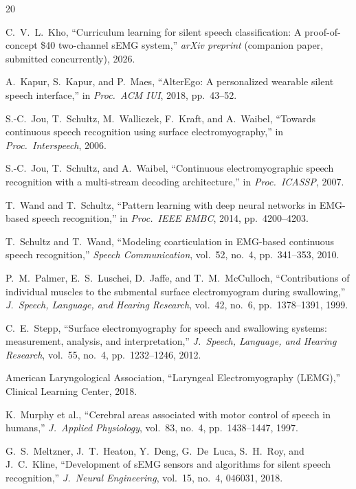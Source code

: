 \documentclass[11pt, a4paper]{article}
\begin{document}
\begin{thebibliography}{20}

C.~V.~L.\ Kho, ``Curriculum learning for silent speech classification: A proof-of-concept \$40 two-channel sEMG system,'' \emph{arXiv preprint} (companion paper, submitted concurrently), 2026.

A.\ Kapur, S.\ Kapur, and P.\ Maes, ``AlterEgo: A personalized wearable silent speech interface,'' in \emph{Proc.\ ACM IUI}, 2018, pp.\ 43--52.

S.-C.\ Jou, T.\ Schultz, M.\ Walliczek, F.\ Kraft, and A.\ Waibel, ``Towards continuous speech recognition using surface electromyography,'' in \emph{Proc.\ Interspeech}, 2006.

S.-C.\ Jou, T.\ Schultz, and A.\ Waibel, ``Continuous electromyographic speech recognition with a multi-stream decoding architecture,'' in \emph{Proc.\ ICASSP}, 2007.

T.\ Wand and T.\ Schultz, ``Pattern learning with deep neural networks in EMG-based speech recognition,'' in \emph{Proc.\ IEEE EMBC}, 2014, pp.\ 4200--4203.

T.\ Schultz and T.\ Wand, ``Modeling coarticulation in EMG-based continuous speech recognition,'' \emph{Speech Communication}, vol.~52, no.~4, pp.\ 341--353, 2010.

P.~M.\ Palmer, E.~S.\ Luschei, D.\ Jaffe, and T.~M.\ McCulloch, ``Contributions of individual muscles to the submental surface electromyogram during swallowing,'' \emph{J.\ Speech, Language, and Hearing Research}, vol.~42, no.~6, pp.\ 1378--1391, 1999.

C.~E.\ Stepp, ``Surface electromyography for speech and swallowing systems: measurement, analysis, and interpretation,'' \emph{J.\ Speech, Language, and Hearing Research}, vol.~55, no.~4, pp.\ 1232--1246, 2012.

American Laryngological Association, ``Laryngeal Electromyography (LEMG),'' Clinical Learning Center, 2018.

K.\ Murphy et al., ``Cerebral areas associated with motor control of speech in humans,'' \emph{J.\ Applied Physiology}, vol.~83, no.~4, pp.\ 1438--1447, 1997.

G.~S.\ Meltzner, J.~T.\ Heaton, Y.\ Deng, G.\ De~Luca, S.~H.\ Roy, and J.~C.\ Kline, ``Development of sEMG sensors and algorithms for silent speech recognition,'' \emph{J.\ Neural Engineering}, vol.~15, no.~4, 046031, 2018.


\end{thebibliography}
\end{document}
